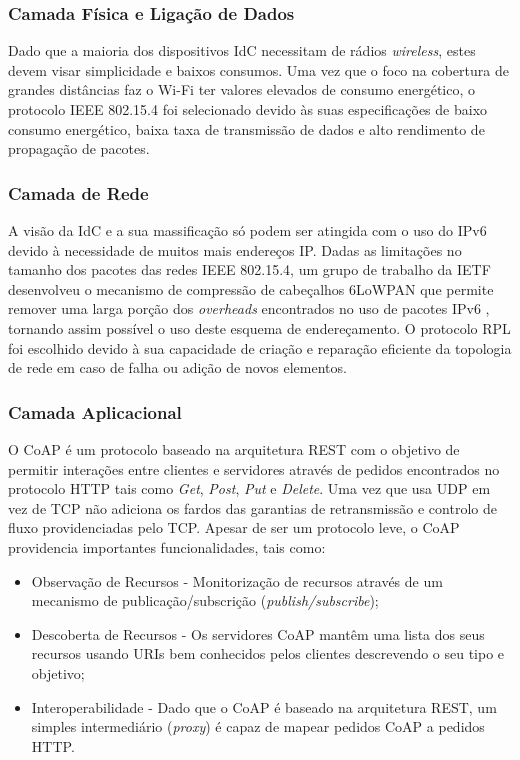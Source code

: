 \documentclass{llncs}
\begin{document}
\subsubsection{Camada Física e Ligação de Dados}
\label{sec:data_link}
Dado que a maioria dos dispositivos \ac{IdC} necessitam de rádios \textit{wireless}, estes devem visar simplicidade e baixos consumos. 
Uma vez que o foco na cobertura de grandes distâncias faz o Wi-Fi\cite{IEEE2012} ter valores elevados de consumo energético, o protocolo IEEE 802.15.4 \cite{IEEEComputerSociety2011} foi selecionado devido às suas especificações de baixo consumo energético, baixa taxa de transmissão de dados e alto rendimento de propagação de pacotes.

\subsubsection{Camada de Rede}
\label{sec:network_layer}
A visão da \ac{IdC} e a sua massificação só podem ser atingida com o uso do IPv6 \cite{Pickard2015} devido à necessidade de muitos mais endereços IP.
Dadas as limitações no tamanho dos pacotes das redes IEEE 802.15.4, um grupo de trabalho da \ac{IETF} desenvolveu o mecanismo de compressão de cabeçalhos \ac{6LoWPAN} \cite{Shelby2012} que permite remover uma larga porção dos \textit{overheads} encontrados no uso de pacotes IPv6 \cite{Hui2008}, tornando assim possível o uso deste esquema de endereçamento. 
O protocolo \ac{RPL} \cite{Winter2012} foi escolhido devido à sua capacidade de criação e reparação eficiente da topologia de rede em caso de falha ou adição de novos elementos.

\subsubsection{Camada Aplicacional}
O \ac{CoAP} \cite{Shelby2014} é um protocolo baseado na arquitetura \ac{REST} com o objetivo de permitir interações entre clientes e servidores através de pedidos encontrados no protocolo HTTP tais como \textit{Get}, \textit{Post}, \textit{Put} e \textit{Delete}. Uma vez que usa \ac{UDP} em vez de \ac{TCP} não adiciona os fardos das garantias de retransmissão e controlo de fluxo providenciadas pelo \ac{TCP}. Apesar de ser um protocolo leve, o \ac{CoAP} providencia importantes funcionalidades, tais como:
\begin{itemize}
	\item Observação de Recursos - Monitorização de recursos através de um mecanismo de publicação/subscrição (\textit{publish/subscribe});		
	\item Descoberta de Recursos - Os servidores \ac{CoAP} mantêm uma lista dos seus recursos usando \ac{URIs} bem conhecidos pelos clientes descrevendo o seu tipo e objetivo;
	\item Interoperabilidade - Dado que o \ac{CoAP} é baseado na arquitetura \ac{REST}, um simples intermediário (\textit{proxy}) é capaz de mapear pedidos \ac{CoAP} a pedidos \ac{HTTP}.
\end{itemize}
\end{document}
